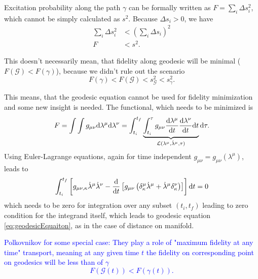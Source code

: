 Excitation probability along the path $\gamma$ can be formally written as $F=\sum_i\Delta s_i^2$, which cannot be simply calculated as $s^2$. Because $\Delta s_i>0$, we have
\begin{equation}
    \begin{split}
        \sum_i \Delta s_i^2& <(\sum_i\Delta s_i)^2\\
        F&<s^2.
    \end{split}
\end{equation}

This doesn't necessarily mean, that fidelity along geodesic will be minimal ($F(\mathcal{G})<F(\gamma)$), because we didn't rule out the scenario 
$$F(\gamma)<F(\mathcal{G})<s_\mathcal{G}^2<s_\gamma^2.$$

This means, that the geodesic equation cannot be used for fidelity minimization and some new insight is needed. The functional, which needs to be minimized is
\begin{equation}
    F=\int\int g_{\mu\nu}\mathrm{d}\lambda^\mu\mathrm{d}\lambda^\nu = \int_{t_i}^{t_f}\underbrace{\int_{t_i}^\tau g_{\mu\nu}\frac{\mathrm{d} \lambda^\mu}{\mathrm{d} t}\frac{\mathrm{d} \lambda^\nu}{\mathrm{d} t} \mathrm{d} t}_{\mathcal{L}(\lambda^\mu,\dot\lambda^\mu,\tau)}\mathrm{d} \tau .
\end{equation}
Using Euler-Lagrange equations, again for time independent $g_{\mu\nu}=g_{\mu\nu}(\lambda^\mu)$, leads to
\begin{equation}
    \int_{t_i}^{t_f}\left[g_{\mu\nu,\kappa}\dot\lambda^\mu\dot\lambda^\nu - \frac{\mathrm{d} }{\mathrm{d} t}\left[g_{\mu\nu}\left(\delta^\mu_\kappa\dot\lambda^\mu+\dot\lambda^\mu\delta^\nu_\kappa\right)\right]\right]\mathrm{d} t=0
\end{equation}
which needs to be zero for integration over any subset $(t_i,t_f)$ leading to zero condition for the integrand itself, which leads to geodesic equation \ref{eq:geodesicEquaiton}, as in the case of distance on manifold.



\textcolor{blue}{Polkovnikov for some special case: They play a role of "maximum fidelity at any time" transport, meaning at any given time $t$ the fidelity on corresponding point on geodesics will be less than of $\gamma$
$$F(\mathcal{G}(t))<F(\gamma(t)).$$ }

